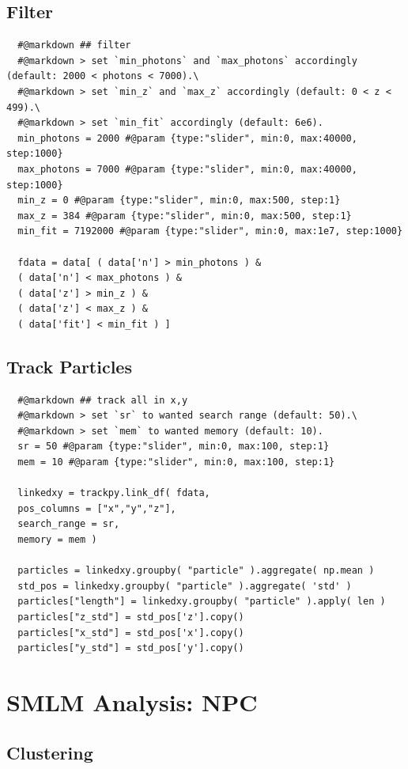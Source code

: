 \documentclass[11pt, a4paper, oneside, twocolumn]{report}
\begin{document}
\subsection{Filter}

\begin{verbatim}
  #@markdown ## filter
  #@markdown > set `min_photons` and `max_photons` accordingly (default: 2000 < photons < 7000).\
  #@markdown > set `min_z` and `max_z` accordingly (default: 0 < z < 499).\
  #@markdown > set `min_fit` accordingly (default: 6e6).
  min_photons = 2000 #@param {type:"slider", min:0, max:40000, step:1000}
  max_photons = 7000 #@param {type:"slider", min:0, max:40000, step:1000}
  min_z = 0 #@param {type:"slider", min:0, max:500, step:1}
  max_z = 384 #@param {type:"slider", min:0, max:500, step:1}
  min_fit = 7192000 #@param {type:"slider", min:0, max:1e7, step:1000}
  
  fdata = data[ ( data['n'] > min_photons ) &
  ( data['n'] < max_photons ) & 
  ( data['z'] > min_z ) &
  ( data['z'] < max_z ) &
  ( data['fit'] < min_fit ) ]
\end{verbatim}


\subsection{Track Particles}

\begin{verbatim}
  #@markdown ## track all in x,y
  #@markdown > set `sr` to wanted search range (default: 50).\
  #@markdown > set `mem` to wanted memory (default: 10).
  sr = 50 #@param {type:"slider", min:0, max:100, step:1}
  mem = 10 #@param {type:"slider", min:0, max:100, step:1}
  
  linkedxy = trackpy.link_df( fdata,
  pos_columns = ["x","y","z"],
  search_range = sr,
  memory = mem )
  
  particles = linkedxy.groupby( "particle" ).aggregate( np.mean )
  std_pos = linkedxy.groupby( "particle" ).aggregate( 'std' )
  particles["length"] = linkedxy.groupby( "particle" ).apply( len )
  particles["z_std"] = std_pos['z'].copy()
  particles["x_std"] = std_pos['x'].copy()
  particles["y_std"] = std_pos['y'].copy()
\end{verbatim}


\section{SMLM Analysis: NPC}

\subsection{Clustering}
\end{document}

